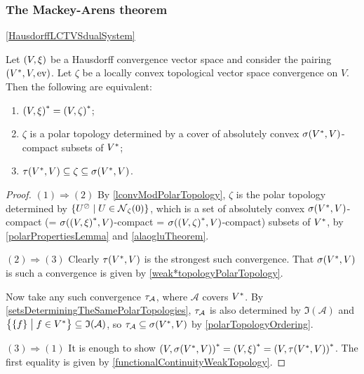 \subsubsection{The Mackey-Arens theorem}


\ref{HausdorffLCTVSdualSystem}

\begin{theorem}
Let $\sSet{V,\xi}$ be a Hausdorff convergence vector space and consider the pairing $\sSet{\dual{V}, V, \evalMap}$. Let $\zeta$ be a locally convex topological vector space convergence on $V$. Then the following are equivalent:
\begin{enumerate}
\item $\dual{\sSet{V,\xi}} = \dual{\sSet{V,\zeta}}$;
\item $\zeta$ is a polar topology determined by a cover of absolutely convex $\sigma({V}^*, V)$-compact subsets of ${V}^*$;
\item $\tau({V}^*, V) \subseteq \zeta \subseteq \sigma({V}^*, V)$.
\end{enumerate}
\end{theorem}
\begin{proof}
$(1) \Rightarrow (2)$ By \ref{lconvModPolarTopology}, $\zeta$ is the polar topology determined by $\setbuilder{U^\pol}{U\in \neighbourhood_\zeta(0)}$, which is a set of absolutely convex $\sigma({V}^*, V)$-compact (= $\sigma(\dual{\sSet{V, \xi}}, V)$-compact = $\sigma(\dual{\sSet{V, \zeta}}, V)$-compact) subsets of ${V}^*$, by \ref{polarPropertiesLemma} and \ref{alaogluTheorem}.

$(2) \Rightarrow (3)$ Clearly $\tau({V}^*, V)$ is the strongest such convergence. That $\sigma({V}^*, V)$ is such a convergence is given by \ref{weak*topologyPolarTopology}. 

Now take any such convergence $\tau_{\mathcal{A}}$, where $\mathcal{A}$ covers ${V}^*$. By \ref{setsDeterminingTheSamePolarTopologies}, $\tau_{\mathcal{A}}$ is also determined by $\mathfrak{I}(\mathcal{A})$ and $\setbuilder[\big]{\{f\}}{f\in \dual{V}} \subseteq \mathfrak{I}(\mathcal{A})$, so $\tau_{\mathcal{A}} \subseteq \sigma({V}^*, V)$ by \ref{polarTopologyOrdering}.

$(3) \Rightarrow (1)$ It is enough to show $\dual{\sSet{V,\sigma(\dual{V}, V)}} = \dual{\sSet{V,\xi}} = \dual{\sSet{V,\tau(\dual{V}, V)}}$. The first equality is given by \ref{functionalContinuityWeakTopology}. 
\end{proof}


